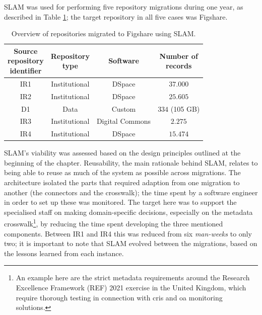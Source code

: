 SLAM was used for performing five repository migrations during one year, as described in Table \ref{tbl:migrations}; the target repository in all five cases was Figshare. 
\begin{table}[thpb]
\centering
\begin{tabular}{|c||c|c|c|}
\hline
\specialcell{Source\\repository\\identifier} & \specialcell{Repository\\type} & Software & \specialcell{Number of\\records}\\ 
\hline\hline
IR1 & Institutional & DSpace & $37.000$ \\ \hline
IR2 & Institutional & DSpace & $25.605$ \\ \hline
D1 & Data & Custom & $334$ (105 GB) \\ \hline
IR3 & Institutional & Digital Commons & $2.275$ \\ \hline
IR4 & Institutional & DSpace & $15.474$ \\ \hline
\end{tabular}
\caption{Overview of repositories migrated to Figshare using SLAM.}
\label{tbl:migrations}
\end{table}

SLAM's viability was assessed based on the design principles outlined at the beginning of the chapter. Reusability, the main rationale behind SLAM, relates to being able to reuse as much of the system as possible across migrations. The architecture isolated the parts that required adaption from one migration to another (the connectors and the crosswalk); the time spent by a software engineer in order to set up these was monitored. The target here was to support the specialised staff on making domain-specific decisions, especially on the metadata crosswalk\footnote{An example here are the strict metadata requirements around the Research Excellence Framework (REF) 2021 exercise in the United Kingdom, which require thorough testing in connection with \gls{cris} and \gls{oa} monitoring solutions.}, by reducing the time spent developing the three mentioned components. Between IR1 and IR4 this was reduced from six \emph{man-weeks} to only two; it is important to note that SLAM evolved between the migrations, based on the lessons learned from each instance. 
    

